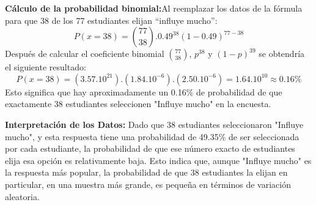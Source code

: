 \textbf{Cálculo de la probabilidad binomial:}Al reemplazar los datos de la fórmula para que 38 de los 77 estudiantes elijan “influye mucho”:
\begin{equation*}
	P(x = 38) = \binom{77}{38} . 0.49^{38}(1-0.49)^{77-38}
\end{equation*}
Después de calcular el coeficiente binomial $\binom{77}{38}$, $p^{38}$ y $(1-p)^39$ se obtendría el siguiente resultado:
\begin{equation*}
	P(x = 38) = (3.57 . 10^{21}) . (1.84 . 10^{-6}) . (2.50 . 10^{-6}) = 1.64 . 10^{10} \approx 0.16\%
\end{equation*}
Esto significa que hay aproximadamente un 0.16\% de probabilidad de que exactamente 38 estudiantes seleccionen "Influye mucho" en la encuesta.

\textbf{Interpretación de los Datos:}
Dado que 38 estudiantes seleccionaron "Influye mucho", y esta respuesta tiene una probabilidad de 49.35\% de ser seleccionada por cada estudiante, la probabilidad de que ese número exacto de estudiantes elija esa opción es relativamente baja. Esto indica que, aunque "Influye mucho" es la respuesta más popular, la probabilidad de que 38 estudiantes la elijan en particular, en una muestra más grande, es pequeña en términos de variación aleatoria.


